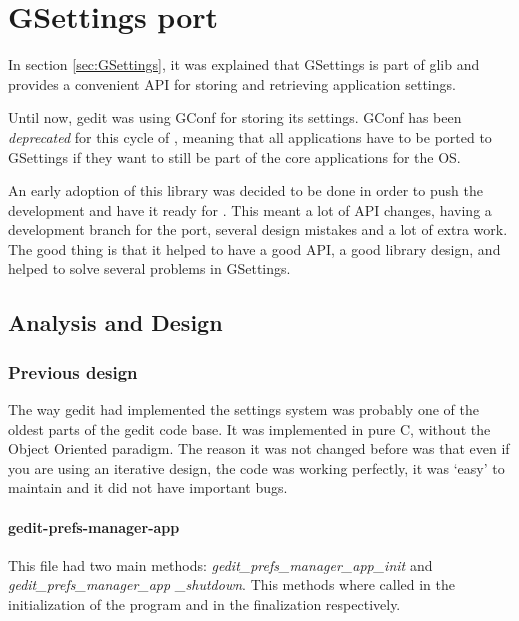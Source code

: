 
\chapter{GSettings port}\label{chap:GSettings}

In section \ref{sec:GSettings}, it was explained that GSettings is part of glib and provides a convenient API for storing and retrieving application settings.

Until now, gedit was using GConf for storing its settings. GConf has been \emph{deprecated} for this cycle of \GNOME, meaning that all \GNOME applications have to be ported to GSettings if they want to still be part of the core applications for the \GNOME OS.

An early adoption of this library was decided to be done in order to push the development and have it ready for . This meant a lot of API changes, having a development branch for the port, several design mistakes and a lot of extra work.   The good thing is that it helped to have a good API, a good library design, and helped to solve several problems in GSettings.

\section{Analysis and Design}

\subsection{Previous design}

The way gedit had implemented the settings system  was probably one of the oldest parts of the gedit code base. It was implemented in pure C, without the Object Oriented paradigm. The reason it was not changed before was that even if you are using an iterative design, the code was working perfectly, it was `easy' to maintain and it did not have important bugs.

\newpage
\subsubsection*{gedit-prefs-manager-app}

This file had two main methods: \textit{gedit\_prefs\_manager\_app\_init} and \textit{gedit\_prefs\_manager\_app \_shutdown}. This methods where called in the initialization of the program and in the finalization respectively.

